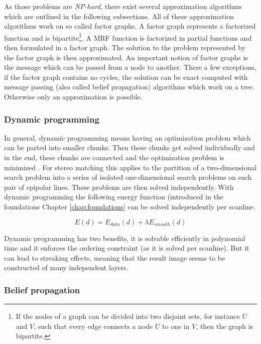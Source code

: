 \noindent As those problems are \textit{NP-hard}, there exist several approximation algorithms which are outlined in the following subsections.
All of these approximation algorithms work on so called factor graphs.
A factor graph represents a factorized function and is bipartite\footnote{If the nodes of a graph can be divided into two disjoint sets, for instance $U$ and $V$, such that every edge connects a node $U$ to one in $V$, then the graph is bipartite.}.
A MRF function is factorized in partial functions and then formulated in a factor graph.
The solution to the problem represented by the factor graph is then approximated.
An important notion of factor graphs is the message which can be passed from a node to another.
There a few exceptions, if the factor graph contains no cycles, the solution can be exact computed with message passing (also called belief propagation) algorithms which work on a tree.
Otherwise only an approximation is possible.


\subsubsection{Dynamic programming}

In general, dynamic programming means having an optimization problem which can be parted into smaller chunks.
Then these chunks get solved individually and in the end, these chunks are connected and the optimization problem is minimized \citep{angel1972dynamic, bellman2015applied, cyganek2011introduction}.
For stereo matching this applies to the partition of a two-dimensional search problem into a series of isolated one-dimensional search problems on each pair of epipolar lines.
These problems are then solved independently.
With dynamic programming the following energy function (introduced in the foundations Chapter \ref{chap:foundations} can be solved independently per scanline.

\begin{equation}
  E(d) = E_{data}(d) + \lambda E_{smooth}(d)
\end{equation}

\noindent Dynamic programming has two benefits, it is solvable efficiently in polynomial time and it enforces the ordering constraint (as it is solved per scanline).
But it can lead to streaking effects, meaning that the result image seems to be constructed of many independent layers.

\subsubsection{Belief propagation}


